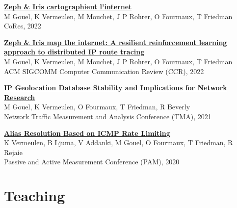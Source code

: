 \documentclass[11pt,a4paper,sans]{moderncv} %
\begin{document}
\vspace{0.25cm}
\href{https://hal.science/hal-03656974/document}{\textbf{Zeph \& Iris cartographient l’internet}}\\
M Gouel, K Vermeulen, M Mouchet, J P Rohrer, O Fourmaux, T Friedman\\
CoRes, 2022

\vspace{0.25cm}
\href{https://hal.science/hal-03597580/document}{\textbf{Zeph \& Iris map the internet: A resilient reinforcement learning approach to distributed IP route tracing}}\\
M Gouel, K Vermeulen, M Mouchet, J P Rohrer, O Fourmaux, T Friedman\\
ACM SIGCOMM Computer Communication Review (CCR), 2022

\vspace{0.25cm}
\href{https://dl.ifip.org/db/conf/tma/tma2021/tma2021-paper2.pdf}{\textbf{IP Geolocation Database Stability and Implications for Network Research}}\\
M Gouel, K Vermeulen, O Fourmaux, T Friedman, R Beverly\\
Network Traffic Measurement and Analysis Conference (TMA), 2021

\vspace{0.25cm}
\href{https://arxiv.org/pdf/2002.00252.pdf}{\textbf{Alias Resolution Based on ICMP Rate Limiting}} \\
K Vermeulen, B Ljuma, V Addanki, M Gouel, O Fourmaux, T Friedman, R Rejaie\\
Passive and Active Measurement Conference (PAM), 2020


\newpage
\section{Teaching}

\end{document}

